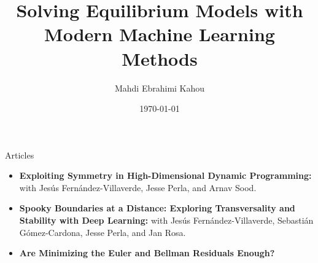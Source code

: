 \documentclass[aspectratio=169,10pt]{beamer}
\newcommand{\emphcolor}[1]{\textbf{\textcolor{emphcolorval}{#1}}}
\begin{document}
	
	
\title{{\vspace{0.4in}\hspace{0.0in}\textcolor{PennBlue}{Solving Equilibrium Models with \\ Modern Machine Learning Methods}}}
\author{\hspace{0.2in}Mahdi Ebrahimi Kahou}
\date{\hspace{0.2in}\today }
\maketitle


\begin{frame}{Articles}
	\begin{itemize}
			\item \emphcolor{Exploiting Symmetry in High-Dimensional Dynamic Programming:} {\small with Jes\'{u}s Fern\'{a}ndez-Villaverde, Jesse Perla, and Arnav Sood}.\\ \medskip
			\item \emphcolor{Spooky Boundaries at a Distance: Exploring Transversality and Stability with Deep Learning:}  {\small with Jes\'{u}s Fern\'{a}ndez-Villaverde, Sebasti\'an G\'omez-Cardona, Jesse Perla, and Jan Rosa}.\\ \medskip
			\item \emphcolor{Are Minimizing the Euler and Bellman Residuals Enough?}
			
	\end{itemize}

\end{frame}
\end{document}
